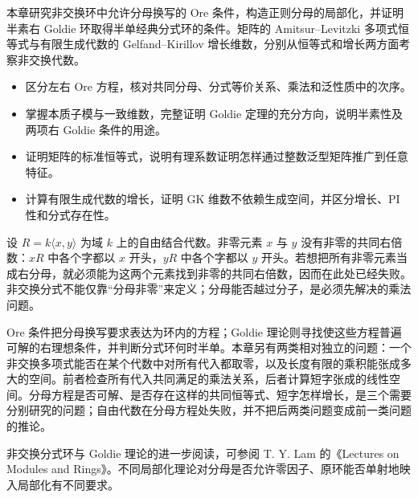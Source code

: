 

\begin{chapterabstract}
	本章研究非交换环中允许分母换写的 Ore 条件，构造正则分母的局部化，并证明半素右 Goldie 环取得半单经典分式环的条件。矩阵的 Amitsur–Levitzki 多项式恒等式与有限生成代数的 Gelfand–Kirillov 增长维数，分别从恒等式和增长两方面考察非交换代数。
\end{chapterabstract}

\begin{learninggoals}
	\begin{itemize}
		\item 区分左右 Ore 方程，核对共同分母、分式等价关系、乘法和泛性质中的次序。
		\item 掌握本质子模与一致维数，完整证明 Goldie 定理的充分方向，说明半素性及两项右 Goldie 条件的用途。
		\item 证明矩阵的标准恒等式，说明有理系数证明怎样通过整数泛型矩阵推广到任意特征。
		\item 计算有限生成代数的增长，证明 GK 维数不依赖生成空间，并区分增长、PI 性和分式存在性。
	\end{itemize}
\end{learninggoals}

设 \(R=k\langle x,y\rangle\) 为域 \(k\) 上的自由结合代数。非零元素 \(x\) 与 \(y\) 没有非零的共同右倍数：\(xR\) 中各个字都以 \(x\) 开头，\(yR\) 中各个字都以 \(y\) 开头。若想把所有非零元素当成右分母，就必须能为这两个元素找到非零的共同右倍数，因而在此处已经失败。非交换分式不能仅靠“分母非零”来定义；分母能否越过分子，是必须先解决的乘法问题。

\ProseParagraphBreak

Ore 条件把分母换写要求表达为环内的方程；Goldie 理论则寻找使这些方程普遍可解的右理想条件，并判断分式环何时半单。本章另有两类相对独立的问题：一个非交换多项式能否在某个代数中对所有代入都取零，以及长度有限的乘积能张成多大的空间。前者检查所有代入共同满足的乘法关系，后者计算短字张成的线性空间。分母方程是否可解、是否存在这样的共同恒等式、短字怎样增长，是三个需要分别研究的问题；自由代数在分母方程处失败，并不把后两类问题变成前一类问题的推论。

\ProseParagraphBreak
非交换分式环与 Goldie 理论的进一步阅读，可参阅 T. Y. Lam 的《Lectures on Modules and Rings》\cite[\S 10A--10B, ``Ore Localizations'' and ``Right Ore Rings and Domains''; \S 11, ``Right Goldie Rings and Goldie's Theorems'']{Lam1999ModulesRings}。不同局部化理论对分母是否允许零因子、原环能否单射地映入局部化有不同要求。

